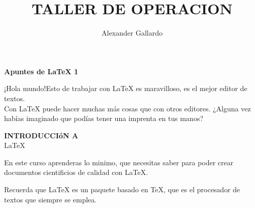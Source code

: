 \documentclass[12pt, a4papper]{article} %
\author{Alexander Gallardo}
\title{TALLER DE OPERACION}
\date{}
\begin{document}
	\maketitle
	
	\begin{center}%
		\textbf{Apuntes de \LaTeX {} 1}
	\end{center}

	\begin{flushleft}
		¡Hola mundo!Esto de trabajar con \LaTeX{} es maravilloso, es el mejor editor de textos.\\
		Con \LaTeX{} puede hacer muchas más cosas que con otros editores.
		¿Alguna vez habías imaginado que podías tener una imprenta en tus manos?
	\end{flushleft}

	\begin{center}
		{\sffamily \bfseries INTRODUCCIóN A}\\
		{\Huge \LaTeX} 
	\end{center}
	
	\begin{flushleft}
		En este curso aprenderas lo minimo, que necesitas saber para poder crear documentos cientificios de calidad con \LaTeX.
		
		Recuerda que \LaTeX {} es un paquete basado en \TeX, que es el procesador de textos que siempre se emplea.
	\end{flushleft}
\end{document}
